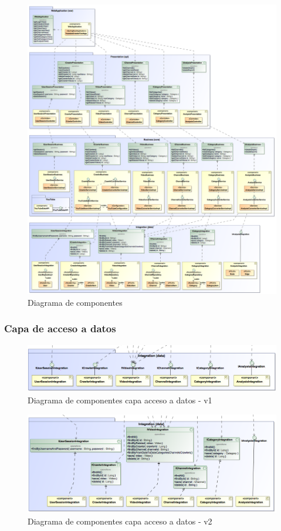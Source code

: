 \documentclass[11pt,a4paper]{article}
\begin{document}
\begin{figure}[H]
\centering
\includegraphics[scale=0.25]{diseno/ComponentDiagram3.png}
\caption{Diagrama de componentes}
\end{figure}

\medskip 

\subsubsection{Capa de acceso a datos}

\begin{figure}[H]
\centering
\includegraphics[scale=0.35]{diseno/accesoDatos/ComponentsDiagram.png}
\caption{Diagrama de componentes capa acceso a datos - v1}
\end{figure}

\begin{figure}[H]
\centering
\includegraphics[scale=0.3]{diseno/accesoDatos/ComponentDiagram2.png}
\caption{Diagrama de componentes capa acceso a datos - v2}
\end{figure}
\end{document}
